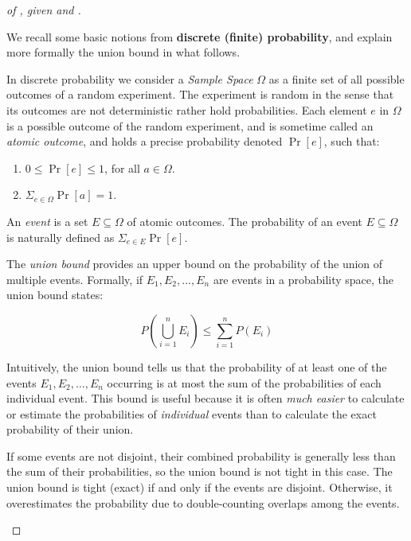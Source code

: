 \begin{proof}[of , given   and ]
\begin{tcolorbox}[colframe=white, colback=blue!4, boxrule=0mm, sharp corners]
We recall some  basic notions from  \textbf{discrete (finite) probability}, and explain more formally the union bound in what follows.

In discrete probability we consider a \emph{ Sample Space}
$\Omega$ as a finite set of  all possible outcomes of a random experiment. The experiment is random in the sense that its outcomes are not deterministic rather hold  probabilities. 
Each element $e$ in $\Omega$ is a possible outcome of the  random experiment, and is sometime called an \emph{atomic outcome}, and  holds a precise probability denoted $\Pr\left[e \right]$, such that:
\begin{enumerate}
\item $0\le \Pr\left[e\right]\le 1$, for all $a\in\Omega$.

\item $\Sigma_{e\in\Omega}\Pr[a]=1$.
\end{enumerate} 

An \emph{event} is a set $E\subseteq\Omega$ of atomic outcomes. The probability of an event $E\subseteq\Omega$ is naturally defined as $\Sigma_{e\in E}\Pr[e]$. 


\bigskip 
The \emph{union bound} provides an upper bound on the probability of the union of multiple events. Formally, if \( E_1, E_2, \dots, E_n \) are events in a probability space, the union bound states:

\[
P\left(\bigcup_{i=1}^n E_i\right) \leq \sum_{i=1}^n P(E_i)
\]

Intuitively, the union bound tells us that the probability of at least one of the events \( E_1, E_2, \dots, E_n \) occurring is at most the sum of the probabilities of each individual event. This bound is useful because it is often \emph{much easier} to calculate or estimate the probabilities of \emph{individual} events than to calculate the exact probability of their union.

 If some events are not disjoint, their combined probability is generally less than the sum of their probabilities, so the union bound is not tight in this case. The union bound is tight (exact) if and only if the events are disjoint. Otherwise, it overestimates the probability due to double-counting overlaps among the events.




\end{tcolorbox}


\end{proof}
